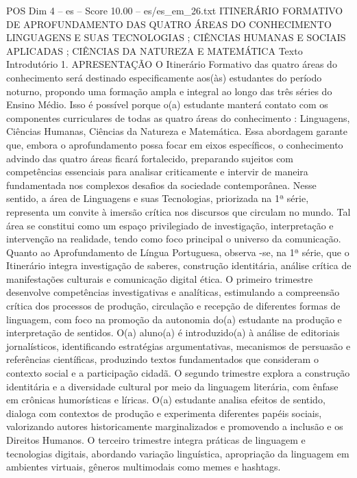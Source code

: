\begin{textsample}{POS Dim 4 – es – Score 10.00 – es/es\_em\_26.txt}  \label{ex:f4_pos_077}
ITINERÁRIO FORMATIVO DE APROFUNDAMENTO DAS QUATRO ÁREAS DO CONHECIMENTO LINGUAGENS E SUAS TECNOLOGIAS ; CIÊNCIAS HUMANAS E SOCIAIS APLICADAS ; CIÊNCIAS DA NATUREZA E MATEMÁTICA Texto Introdutório 1.
APRESENTAÇÃO O Itinerário Formativo das quatro áreas do conhecimento será destinado especificamente aos(às) estudantes do período noturno, propondo uma formação ampla e integral ao longo das três séries do Ensino Médio.
Isso é possível porque o(a) estudante manterá contato com os componentes curriculares de todas as quatro áreas do conhecimento : Linguagens, Ciências Humanas, Ciências da Natureza e Matemática.
Essa abordagem garante que, embora o aprofundamento possa focar em eixos específicos, o conhecimento advindo das quatro áreas ficará fortalecido, preparando sujeitos com competências essenciais para analisar criticamente e intervir de maneira fundamentada nos complexos desafios da sociedade contemporânea.
Nesse sentido, a área de Linguagens e suas Tecnologias, priorizada na 1ª série, representa um convite à imersão crítica nos discursos que circulam no mundo.
Tal área se constitui como um espaço privilegiado de investigação, interpretação e intervenção na realidade, tendo como foco principal o universo da comunicação.
Quanto ao Aprofundamento de Língua Portuguesa, observa -se, na 1ª série, que o Itinerário integra investigação de saberes, construção identitária, análise crítica de manifestações culturais e comunicação digital ética.
O primeiro trimestre desenvolve competências investigativas e analíticas, estimulando a compreensão crítica dos processos de produção, circulação e recepção de diferentes formas de linguagem, com foco na promoção da autonomia do(a) estudante na produção e interpretação de sentidos.
O(a) aluno(a) é introduzido(a) à análise de editoriais jornalísticos, identificando estratégias argumentativas, mecanismos de persuasão e referências científicas, produzindo textos fundamentados que consideram o contexto social e a participação cidadã.
O segundo trimestre explora a construção identitária e a diversidade cultural por meio da linguagem literária, com ênfase em crônicas humorísticas e líricas.
O(a) estudante analisa efeitos de sentido, dialoga com contextos de produção e experimenta diferentes papéis sociais, valorizando autores historicamente marginalizados e promovendo a inclusão e os Direitos Humanos.
O terceiro trimestre integra práticas de linguagem e tecnologias digitais, abordando variação linguística, apropriação da linguagem em ambientes virtuais, gêneros multimodais como memes e hashtags.

\end{textsample}
